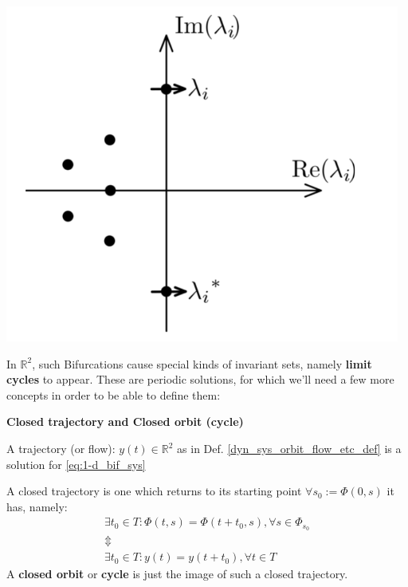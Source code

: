 \includegraphics[width=13cm]{math_pics/hopf-bif-eigenvalue-graph.png}

In $\mathbb{R}^2$, such Bifurcations cause special kinds of invariant sets, namely \textbf{limit cycles} to appear. These are periodic solutions, for which we'll need a few more concepts in order to be able to define them:
\begin{definition} \textbf{Closed trajectory and Closed orbit (cycle)}

  A trajectory (or flow): $y(t) \in \mathbb{R}^2$ as in Def. \ref{dyn_sys_orbit_flow_etc_def} is a solution for \ref{eq:1-d_bif_sys}

  A closed trajectory is one which returns to its starting point $\forall s_0 := \Phi(0,s) $ it has, namely:
  \begin{gather*}
    \exists t_0 \in T : \Phi(t,s) = \Phi(t+t_0,s), \forall s \in \Phi_{s_0}     \\
    \Updownarrow \\
    \exists t_0 \in T : y(t) = y(t+t_0), \forall t \in T
  \end{gather*}
  A \textbf{closed orbit} or \textbf{cycle} is just the image of such a closed trajectory.
\end{definition}

